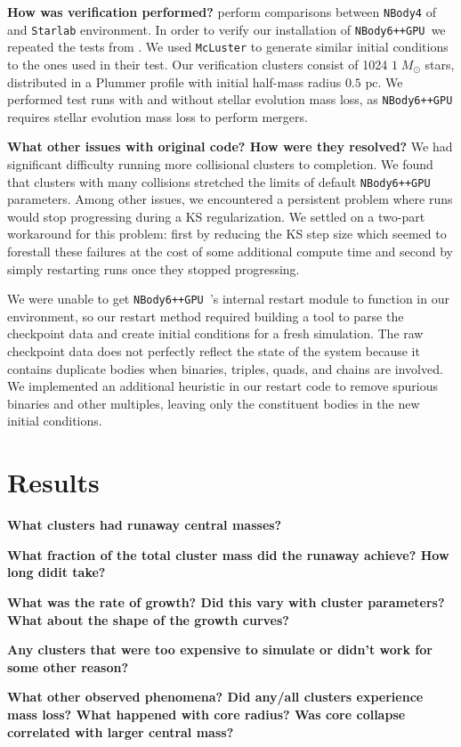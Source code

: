 \documentclass[preprint1]{aastex}
\newcommand\Msun{\; M_\odot}
\newcommand\pc{\mbox{ pc}}
\newcommand\nbody{\texttt{NBody6++GPU }}
\numberwithin{equation}{section}
\begin{document}
\textbf{How was verification performed?}
\citet{2009Anders, 2012Anders} perform comparisons between \texttt{NBody4} of \citet{1999Aarseth} and \texttt{Starlab} environment.  In order to verify our installation of \nbody we repeated the tests from \citet{2009Anders}.  We used \texttt{McLuster} to generate similar initial conditions to the ones used in their test. Our verification clusters consist of 1024 $1 \Msun$ stars, distributed in a Plummer profile with initial half-mass radius $0.5 \pc$.  We performed test runs with and without stellar evolution mass loss, as \nbody requires stellar evolution mass loss to perform mergers.

\textbf{What other issues with original code?  How were they resolved?}
We had significant difficulty running more collisional clusters to completion.  We found that clusters with many collisions stretched the limits of default \nbody parameters.  Among other issues, we encountered a persistent problem where runs would stop progressing during a KS regularization.  We settled on a two-part workaround for this problem: first by reducing the KS step size which seemed to forestall these failures at the cost of some additional compute time and second by simply restarting runs once they stopped progressing. 

We were unable to get \nbody's internal restart module to function in our environment, so our restart method required building a tool to parse the checkpoint data and create initial conditions for a fresh simulation.  The raw checkpoint data does not perfectly reflect the state of the system because it contains duplicate bodies when binaries, triples, quads, and chains are involved. We implemented an additional heuristic in our restart code to remove spurious binaries and other multiples, leaving only the constituent bodies in the new initial conditions.

\section{Results} \label{Results}

\textbf{What clusters had runaway central masses?}

\textbf{What fraction of the total cluster mass did the runaway achieve?  How long didit take?}

\textbf{What was the rate of growth?  Did this vary with cluster parameters?  What about the shape of the growth curves?}

\textbf{Any clusters that were too expensive to simulate or didn't work for some other reason?}

\textbf{What other observed phenomena?  Did any/all clusters experience mass loss?  What happened with core radius?  Was core collapse correlated with larger central mass?}





\end{document}
